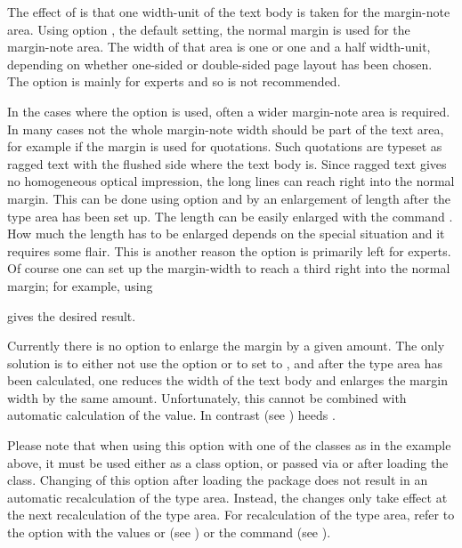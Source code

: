 The effect of  is that one width-unit of
the text body is taken for the margin-note area.  Using option
, the default setting, the normal
margin is used for the margin-note area.  The width of that area is
one or one and a half width-unit, depending on whether one-sided or
double-sided page layout has been chosen.  The option
 is mainly for experts and so is not recommended.
  
\begin{Explain}
  In the cases where the option  is used, often a
  wider margin-note area is required.  In many cases not the whole
  margin-note width should be part of the text area, for example if
  the margin is used for quotations.  Such quotations are typeset as
  ragged text with the flushed side where the text body is.  Since
  ragged text gives no homogeneous optical impression, the long lines
  can reach right into the normal margin.  This can be done using
  option  and by an enlargement of length
   after the type area has been set up.  The
  length can be easily enlarged with the command .
  How much the length has to be enlarged depends on the special
  situation and it requires some flair.  This is another reason the
   option is primarily left for experts.  Of course
  one can set up the margin-width to reach a third right into the
  normal margin; for example, using
\begin{lstcode}[belowskip=\dp\strutbox]
  \setlength{\marginparwidth}{1.5\marginparwidth}
\end{lstcode}
  gives the desired result.

  Currently there is no option to enlarge the margin by a given
  amount.  The only solution is to either not use the option
   or to set  to ,
  and after the type area has been calculated, one reduces the
  width of the text body  and enlarges the margin
  width  by the same amount.  Unfortunately,
  this cannot be combined with automatic calculation of the
   value.  In contrast
   (see
  ) heeds
  .
\end{Explain}

Please note that when using this option with one of the {\KOMAScript}
classes as in the example above, it must be used either as a class
option, or passed via  or  after
loading the class. Changing of this option after loading the
 package does not result in an automatic
recalculation of the type area. Instead, the changes only take effect
at the next recalculation of the type area. For recalculation of the
type area, refer to the  option with the values
 or  (see
) or the
 command (see
).%
%
\EndIndexGroup



